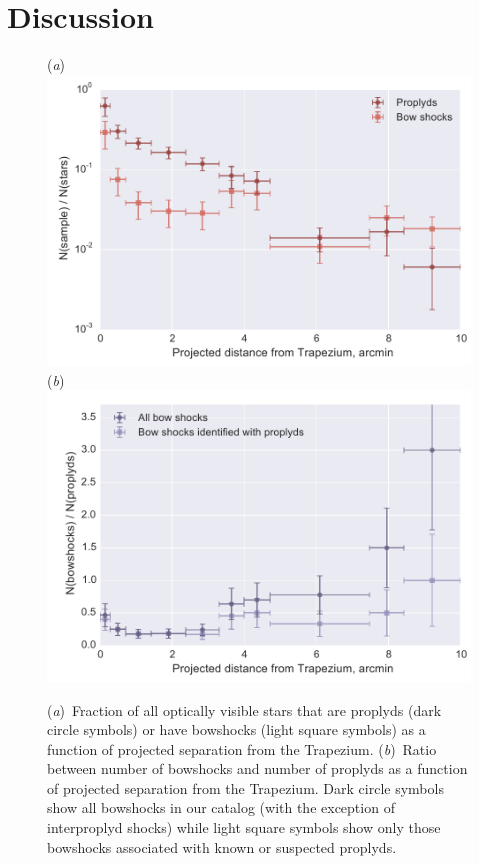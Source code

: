 \documentclass{emulateapj}
\begin{document}
\clearpage
\section{Discussion}
\label{sec:discuss}
\begin{figure}
  (\textit{a})\\
  \includegraphics[width=\linewidth]{proplyd-star-ratio}\\
  (\textit{b})\\
  \includegraphics[width=\linewidth]{bowshock-proplyd-ratio}
  \caption{(\textit{a})~Fraction of all optically visible stars that
    are proplyds (dark circle symbols) or have bowshocks (light square
    symbols) as a function of projected separation from the Trapezium.
    (\textit{b})~Ratio between number of bowshocks and number of
    proplyds as a function of projected separation from the Trapezium.
    Dark circle symbols show all bowshocks in our catalog (with the
    exception of interproplyd shocks) while light square symbols show
    only those bowshocks associated with known or suspected proplyds.
  }
  \label{fig:bow-proplyd-star-ratios}
\end{figure}
\end{document}
